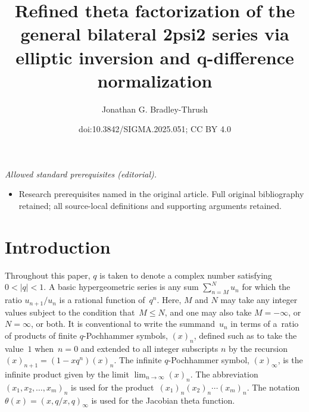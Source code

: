 \documentclass[10pt,a4paper]{amsart}
\title{Refined theta factorization of the general bilateral 2psi2 series via elliptic inversion and q-difference normalization}
\author{Jonathan G. Bradley-Thrush}
\date{doi:10.3842/SIGMA.2025.051; CC BY 4.0}
\numberwithin{equation}{section}
\begin{document}
\maketitle
\noindent\textit{Allowed standard prerequisites (editorial).}\begin{itemize}
\item Research prerequisites named in the original article. Full original bibliography retained; all source-local definitions and supporting arguments retained.
\end{itemize}\medskip
\section{Introduction}

Throughout this paper, $q$ is taken to denote a complex number satisfying $0<|q|<1$. A basic hypergeometric series is any sum $\sum_{n=M}^N u_n$ for which the ratio $u_{n+1}/u_n$ is a rational function of~$q^n$. Here, $M$ and $N$ may take any integer values subject to the condition that~${M \leq N}$, and one may also take $M=-\infty$, or $N=\infty$, or both. It is conventional to write the summand~$u_n$ in terms of a~ratio of products of finite $q$-Pochhammer symbols, $(x)_n$, defined such as to take the value~$1$ when~${n=0}$ and extended to all integer subscripts $n$ by the recursion~${(x)_{n+1} = (1-xq^n)(x)_n}$. The infinite $q$-Pochhammer symbol, $(x)_\infty$, is the infinite product given by the limit $\lim_{n \rightarrow \infty} (x)_n$. The abbreviation $(x_1,x_2, \dots, x_m)_n$ is used for the product~${(x_1)_n (x_2)_n \cdots (x_m)_n}$. The notation~${\theta(x) = (x,q/x,q)_\infty}$ is used for the Jacobian theta function.
\end{document}
